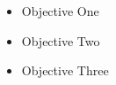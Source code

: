 \begin{itemize}
    \item Objective One
    \item Objective Two 
    \item Objective Three
\end{itemize}
\lipsum[1]

\lipsum[2]
